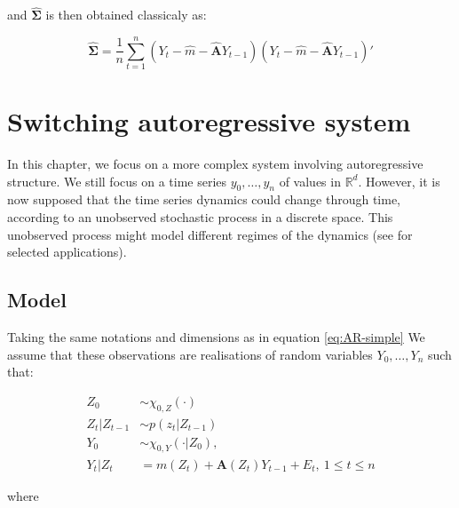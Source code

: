 \documentclass[]{book}
\begin{document}
and \(\hat{\mathbf{\Sigma}}\) is then obtained classicaly as:

\begin{equation}
\hat{\mathbf{\Sigma}} = \frac{1}{n} \sum_{t = 1}^n \left(Y_t - \hat{m} - \hat{\mathbf{A}} Y_{t - 1}\right) \left(Y_t - \hat{m} - \hat{\mathbf{A}} Y_{t - 1}\right)' \label{eq:AR-simple-Sigma-hat}
\end{equation}

\chapter{Switching autoregressive
system}\label{switching-autoregressive-system}

In this chapter, we focus on a more complex system involving
autoregressive structure. We still focus on a time series
\(y_0, \dots, y_n\) of values in \(\mathbb{R}^d\). However, it is now
supposed that the time series dynamics could change through time,
according to an unobserved stochastic process in a discrete space. This
unobserved process might model different regimes of the dynamics (see
\citet{rabiner1989tutorial} for selected applications).

\section{Model}\label{model-1}

Taking the same notations and dimensions as in equation
\eqref{eq:AR-simple} We assume that these observations are realisations of
random variables \(Y_0,\dots, Y_n\) such that:

\begin{align*}
Z_0 &\sim \chi_{0, Z}(\cdot)\\
Z_t \vert Z_{t - 1} &\sim p(z_t \vert Z_{t - 1}) \\
Y_0 &\sim \chi_{0, Y}(\cdot \vert Z_0), \\
Y_t \vert Z_t &= m(Z_t) + \mathbf{A}(Z_t)Y_{t -1} + E_t,~1\leq t \leq n 
\end{align*}

where
\end{document}
